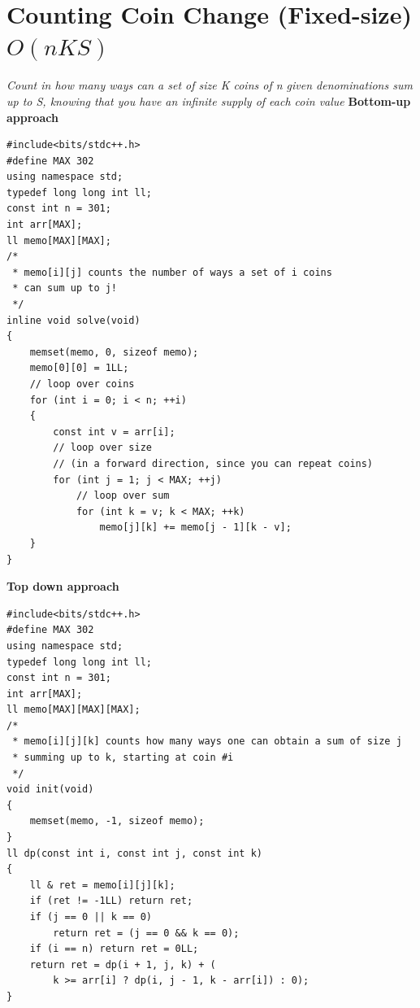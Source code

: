 \documentclass[12pt]{book}
\begin{document}
\section{Counting Coin Change (Fixed-size) $O(nKS)$}
\textit{Count in how many ways can a set of size K coins of n given denominations sum up to S, knowing that you have an infinite supply of each coin value}
\textbf{Bottom-up approach}
\begin{verbatim}
#include<bits/stdc++.h>
#define MAX 302
using namespace std;
typedef long long int ll;
const int n = 301;
int arr[MAX];
ll memo[MAX][MAX];
/*
 * memo[i][j] counts the number of ways a set of i coins
 * can sum up to j!
 */
inline void solve(void)
{
	memset(memo, 0, sizeof memo);
	memo[0][0] = 1LL;
	// loop over coins
	for (int i = 0; i < n; ++i)
	{
		const int v = arr[i];
		// loop over size
		// (in a forward direction, since you can repeat coins)
		for (int j = 1; j < MAX; ++j)
			// loop over sum
			for (int k = v; k < MAX; ++k)
				memo[j][k] += memo[j - 1][k - v];
	}
}
\end{verbatim}
\textbf{Top down approach}
\begin{verbatim}
#include<bits/stdc++.h>
#define MAX 302
using namespace std;
typedef long long int ll;
const int n = 301;
int arr[MAX];
ll memo[MAX][MAX][MAX];
/*
 * memo[i][j][k] counts how many ways one can obtain a sum of size j
 * summing up to k, starting at coin #i
 */
void init(void)
{
	memset(memo, -1, sizeof memo);
}
ll dp(const int i, const int j, const int k)
{
	ll & ret = memo[i][j][k];
	if (ret != -1LL) return ret;
	if (j == 0 || k == 0)
		return ret = (j == 0 && k == 0);
	if (i == n) return ret = 0LL;
	return ret = dp(i + 1, j, k) + (
		k >= arr[i] ? dp(i, j - 1, k - arr[i]) : 0);
}
\end{verbatim}
\end{document}

